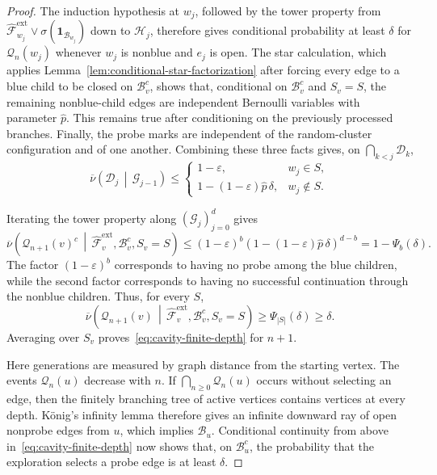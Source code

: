 \documentclass[11pt]{amsart}
\theoremstyle{plain}
\theoremstyle{definition}
\theoremstyle{remark}
\begin{document}
\begin{proof}
The induction hypothesis at $w_j$, followed by the tower property from $\widehat{\mathcal F}_{w_j}^{\mathrm{ext}}\vee\sigma(\mathbf 1_{\mathcal B_{w_j}})$ down to $\mathcal H_j$, therefore gives conditional probability at least $\delta$ for $\mathcal Q_n(w_j)$ whenever $w_j$ is nonblue and $e_j$ is open. The star calculation, which applies Lemma~\ref{lem:conditional-star-factorization} after forcing every edge to a blue child to be closed on $\mathcal B_v^c$, shows that, conditional on $\mathcal B_v^c$ and $S_v=S$, the remaining nonblue-child edges are independent Bernoulli variables with parameter $\widehat p$. This remains true after conditioning on the previously processed branches. Finally, the probe marks are independent of the random-cluster configuration and of one another. Combining these three facts gives, on $\bigcap_{k<j}\mathcal D_k$,
\[
    \overline\nu\left(
        \mathcal D_j
        \,\middle|\,
        \mathcal G_{j-1}
    \right)
    \le
    \begin{cases}
        1-\varepsilon,
        & w_j\in S,\\
        1-(1-\varepsilon)\widehat p\,\delta,
        & w_j\notin S.
    \end{cases}
\]

Iterating the tower property along $(\mathcal G_j)_{j=0}^d$ gives
\[
    \overline\nu\left(
        \mathcal Q_{n+1}(v)^c
        \,\middle|\,
        \widehat{\mathcal F}_v^{\mathrm{ext}},
        \mathcal B_v^c,
        S_v=S
    \right)
    \le
    (1-\varepsilon)^b
    \left(
        1-(1-\varepsilon)\widehat p\,\delta
    \right)^{d-b}
    =
    1-\Psi_b(\delta).
\]
The factor $(1-\varepsilon)^b$ corresponds to having no probe among the blue children, while the second factor corresponds to having no successful continuation through the nonblue children. Thus, for every $S$,
\[
    \overline\nu\left(
        \mathcal Q_{n+1}(v)
        \,\middle|\,
        \widehat{\mathcal F}_v^{\mathrm{ext}},
        \mathcal B_v^c,
        S_v=S
    \right)
    \ge
    \Psi_{|S|}(\delta)
    \ge
    \delta.
\]
Averaging over $S_v$ proves~\eqref{eq:cavity-finite-depth} for $n+1$.

Here generations are measured by graph distance from the starting vertex. The events $\mathcal Q_n(u)$ decrease with $n$. If $\bigcap_{n\ge0}\mathcal Q_n(u)$ occurs without selecting an edge, then the finitely branching tree of active vertices contains vertices at every depth. K\"onig's infinity lemma therefore gives an infinite downward ray of open nonprobe edges from $u$, which implies $\mathcal B_u$. Conditional continuity from above in~\eqref{eq:cavity-finite-depth} now shows that, on $\mathcal B_u^c$, the probability that the exploration selects a probe edge is at least $\delta$.


\end{proof}
\end{document}
